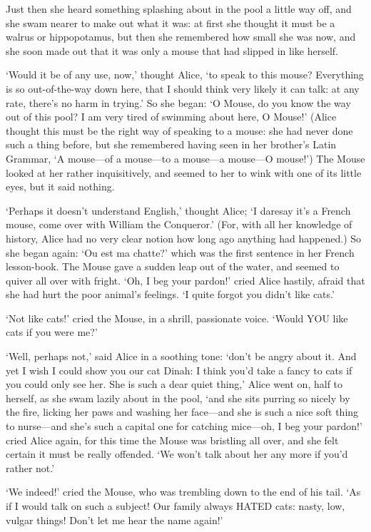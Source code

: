 \documentclass[12pt]{book}
\begin{document}
\begin{Parallel}[p]{}{}
{Just then she heard something splashing about in the pool a little way off, and she swam nearer to make out what it was: at first she thought it must be a walrus or hippopotamus, but then she remembered how small she was now, and she soon made out that it was only a mouse that had slipped in like herself.

‘Would it be of any use, now,’ thought Alice, ‘to speak to this mouse? Everything is so out-of-the-way down here, that I should think very likely it can talk: at any rate, there’s no harm in trying.’ So she began: ‘O Mouse, do you know the way out of this pool? I am very tired of swimming about here, O Mouse!’ (Alice thought this must be the right way of speaking to a mouse: she had never done such a thing before, but she remembered having seen in her brother’s Latin Grammar, ‘A mouse—of a mouse—to a mouse—a mouse—O mouse!’) The Mouse looked at her rather inquisitively, and seemed to her to wink with one of its little eyes, but it said nothing.

‘Perhaps it doesn’t understand English,’ thought Alice; ‘I daresay it’s a French mouse, come over with William the Conqueror.’ (For, with all her knowledge of history, Alice had no very clear notion how long ago anything had happened.) So she began again: ‘Ou est ma chatte?’ which was the first sentence in her French lesson-book. The Mouse gave a sudden leap out of the water, and seemed to quiver all over with fright. ‘Oh, I beg your pardon!’ cried Alice hastily, afraid that she had hurt the poor animal’s feelings. ‘I quite forgot you didn’t like cats.’

‘Not like cats!’ cried the Mouse, in a shrill, passionate voice. ‘Would YOU like cats if you were me?’

‘Well, perhaps not,’ said Alice in a soothing tone: ‘don’t be angry about it. And yet I wish I could show you our cat Dinah: I think you’d take a fancy to cats if you could only see her. She is such a dear quiet thing,’ Alice went on, half to herself, as she swam lazily about in the pool, ‘and she sits purring so nicely by the fire, licking her paws and washing her face—and she is such a nice soft thing to nurse—and she’s such a capital one for catching mice—oh, I beg your pardon!’ cried Alice again, for this time the Mouse was bristling all over, and she felt certain it must be really offended. ‘We won’t talk about her any more if you’d rather not.’

‘We indeed!’ cried the Mouse, who was trembling down to the end of his tail. ‘As if I would talk on such a subject! Our family always HATED cats: nasty, low, vulgar things! Don’t let me hear the name again!’

}
\end{Parallel}
\end{document}
